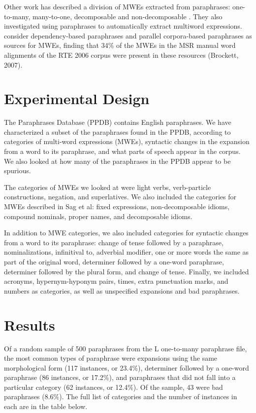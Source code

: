 \documentclass[11pt]{article}
\begin{document}
Other work has described a division of MWEs extracted from paraphrases: one-to-many, many-to-one,  decomposable and non-decomposable \cite{dpm}. They also investigated using paraphrases to automatically extract multiword expressions. \cite{dpm} consider dependency-based paraphrases and parallel corpora-based paraphrases as sources for MWEs, finding that 34\% of the MWEs in the MSR manual word alignments of the RTE 2006 corpus were present in these resources (Brockett, 2007). 

\section{Experimental Design}
The Paraphrases Database (PPDB) contains English paraphrases. We have characterized a subset of the paraphrases found in the PPDB, according to categories of multi-word expressions (MWEs), syntactic changes in the expansion from a word to its paraphrase, and what parts of speech appear in the corpus. We also looked at how many of the paraphrases in the PPDB appear to be spurious.

The categories of MWEs we looked at were light verbs, verb-particle constructions, negation, and superlatives. We also included the categories for MWEs described in Sag et al: fixed expressions, non-decomposable idioms, compound nominals, proper names, and decomposable idioms. 

In addition to MWE categories, we also included categories for syntactic changes from a word to its paraphrase: change of tense followed by a paraphrase, nominalizations, infinitival to, adverbial modifier, one or more words the same as part of the original word, determiner followed by a one-word paraphrase, determiner followed by the plural form, and change of tense. Finally, we included acronyms, hypernym-hyponym pairs, times, extra punctuation marks, and numbers as categories, as well as unspecified expansions and bad paraphrases. 

\section{Results}

Of a random sample of 500 paraphrases from the L one-to-many paraphrase file, the most common types of paraphrase were expansions using the same morphological form (117 instances, or 23.4\%), determiner followed by a one-word paraphrase (86 instances, or 17.2\%), and paraphrases that did not fall into a particular category (62 instances, or 12.4\%). Of the sample, 43 were bad paraphrases (8.6\%). The full list of categories and the number of instances in each are in the table below.  
\end{document}
